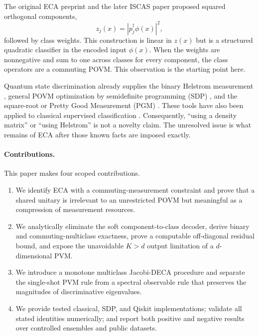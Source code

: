 \documentclass[10pt,twocolumn]{article}
\theoremstyle{definition}
\theoremstyle{remark}
\begin{document}
The original ECA preprint \cite{chen2020preprint} and the later ISCAS paper
\cite{chen2025eca} proposed squared orthogonal components,
\begin{equation}
  z_j(x)=|p_j^\dagger \phi(x)|^2,
  \label{eq:energy_feature}
\end{equation}
followed by class weights.  This construction is linear in $z(x)$ but is a
structured quadratic classifier in the encoded input $\phi(x)$.  When the
weights are nonnegative and sum to one across classes for every component,
the class operators are a commuting POVM.  This observation is the starting
point here.

Quantum state discrimination already supplies the binary Helstrom
measurement \cite{helstrom1976}, general POVM optimization by semidefinite
programming (SDP) \cite{eldar2003}, and the square-root or Pretty Good
Measurement (PGM) \cite{hausladen1994}.  These tools have also been applied to
classical supervised classification
\cite{sergioli2019,giuntini2021,lloyd2020,cruzeiro2023,hwang2024}.
Consequently, ``using a density matrix'' or ``using Helstrom'' is not a
novelty claim.  The unresolved issue is what remains of ECA after those known
facts are imposed exactly.

\paragraph{Contributions.}
This paper makes four scoped contributions.
\begin{enumerate}
  \item We identify ECA with a commuting-measurement constraint and prove that
  a shared unitary is irrelevant to an unrestricted POVM but meaningful as a
  compression of measurement resources.
  \item We analytically eliminate the soft component-to-class decoder,
  derive binary and commuting-multiclass exactness, prove a computable
  off-diagonal residual bound, and expose the unavoidable $K>d$ output
  limitation of a $d$-dimensional PVM.
  \item We introduce a monotone multiclass Jacobi-DECA procedure and separate
  the single-shot PVM rule from a spectral observable rule that preserves the
  magnitudes of discriminative eigenvalues.
  \item We provide tested classical, SDP, and Qiskit implementations; validate
  all stated identities numerically; and report both positive and negative
  results over controlled ensembles and public datasets.
\end{enumerate}
\end{document}
